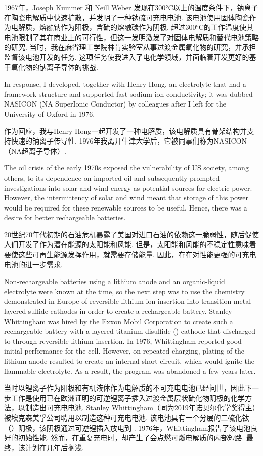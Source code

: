 \begin{multicols}{2}
1967年，Joseph Kummer 和 Neill Weber 发现在300°C以上的温度条件下，钠离子在陶瓷电解质中快速扩散，并发明了一种钠硫可充电电池. 该电池使用固体陶瓷作为电解质，熔融钠作为阳极，含硫的熔融碳作为阴极. 超过300°C的工作温度使其电池限制了其在商业上的可行性，但这一发明激发了对固体电解质和替代电池策略的研究. 当时，我在麻省理工学院林肯实验室从事过渡金属氧化物的研究，并承担监督该电池开发的任务. 这项任务使我进入了电化学领域，并面临着开发更好的基于氧化物的钠离子导体的挑战. 

In response, I developed, together with Henry Hong, an  electrolyte that had a framework structure and supported fast sodium ion conductivity; it was dubbed NASICON (NA SuperIonic Conductor) by colleagues after I left for the University of Oxford in 1976. 

作为回应，我与Henry Hong一起开发了一种电解质，该电解质具有骨架结构并支持快速的钠离子传导性.  1976年我离开牛津大学后，它被同事们称为NASICON（NA超离子导体）. 

The oil crisis of the early 1970s exposed the vulnerability of US society, among others, to its dependence on imported oil and subsequently prompted investigations into solar and wind energy as potential sources for electric power. However, the intermittency of solar and wind meant that storage of this power would be required for these renewable sources to be useful. Hence, there was a desire for better rechargeable batteries. 

20世纪70年代初期的石油危机暴露了美国对进口石油的依赖这一脆弱性，随后促使人们开发了作为潜在能源的太阳能和风能. 但是，太阳能和风能的不稳定性意味着要使这些可再生能源发挥作用，就需要存储能量. 因此，存在对性能更强的可充电电池的进一步需求. 

Non-rechargeable batteries using a lithium anode and an organic-liquid electrolyte were known at the time, so the next step was to use the chemistry demonstrated in Europe of reversible lithium-ion insertion into transition-metal layered sulfide cathodes in order to create a rechargeable battery. Stanley Whittingham was hired by the Exxon Mobil Corporation to create such a rechargeable battery with a layered titanium disulfide () cathode that discharged to  through reversible lithium insertion. In 1976, Whittingham reported good initial performance for the cell. However, on repeated charging, plating of the lithium anode resulted to create an internal short circuit, which would ignite the flammable electrolyte. As a result, the program was abandoned a few years later. 

当时以锂离子作为阳极和有机液体作为电解质的不可充电电池已经问世，因此下一步工作是使用已在欧洲证明的可逆锂离子插入过渡金属层状硫化物阴极的化学方法，以制造出可充电电池. Stanley Whittingham（同为2019年诺贝尔化学奖得主）被埃克森美孚公司聘用以制造这种可充电电池. 该电池具有一个分层的二硫化钛（）阴极，该阴极通过可逆锂插入放电到  .  1976年，Whittingham报告了该电池良好的初始性能. 然而，在重复充电时，却产生了会点燃可燃电解质的内部短路. 最终，该计划在几年后搁浅. 


\end{multicols}
